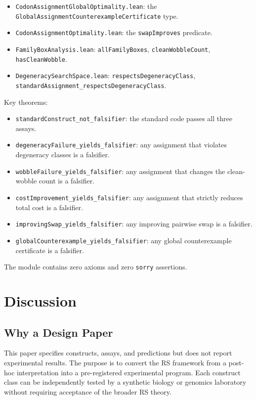\documentclass[11pt,twocolumn]{article}
\begin{document}
\begin{itemize}
\item \texttt{CodonAssignmentGlobalOptimality.lean}: the
  \texttt{GlobalAssignmentCounterexampleCertificate} type.
\item \texttt{CodonAssignmentOptimality.lean}: the \texttt{swapImproves}
  predicate.
\item \texttt{FamilyBoxAnalysis.lean}: \texttt{allFamilyBoxes},
  \texttt{cleanWobbleCount}, \texttt{hasCleanWobble}.
\item \texttt{DegeneracySearchSpace.lean}:
  \texttt{respectsDegeneracyClass},
  \texttt{standardAssignment\_respectsDegeneracyClass}.
\end{itemize}

Key theorems:
\begin{itemize}
\item \texttt{standardConstruct\_not\_falsifier}: the standard code
  passes all three assays.
\item \texttt{degeneracyFailure\_yields\_falsifier}: any assignment that
  violates degeneracy classes is a falsifier.
\item \texttt{wobbleFailure\_yields\_falsifier}: any assignment that
  changes the clean-wobble count is a falsifier.
\item \texttt{costImprovement\_yields\_falsifier}: any assignment that
  strictly reduces total cost is a falsifier.
\item \texttt{improvingSwap\_yields\_falsifier}: any improving pairwise
  swap is a falsifier.
\item \texttt{globalCounterexample\_yields\_falsifier}: any global
  counterexample certificate is a falsifier.
\end{itemize}

The module contains zero axioms and zero \texttt{sorry} assertions.

\section{Discussion}

\subsection{Why a Design Paper}

This paper specifies constructs, assays, and predictions but does not
report experimental results. The purpose is to convert the RS framework
from a post-hoc interpretation into a pre-registered experimental program.
Each construct class can be independently tested by a synthetic biology
or genomics laboratory without requiring acceptance of the broader RS
theory.
\end{document}
